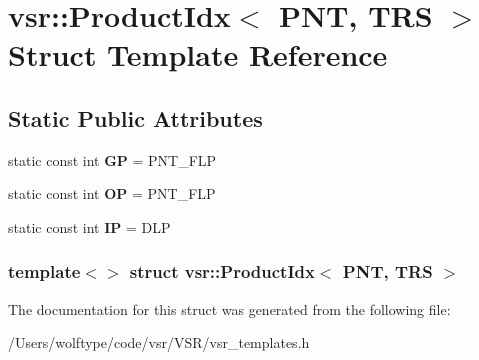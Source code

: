 \hypertarget{structvsr_1_1_product_idx_3_01_p_n_t_00_01_t_r_s_01_4}{\section{vsr\-:\-:Product\-Idx$<$ P\-N\-T, T\-R\-S $>$ Struct Template Reference}
\label{structvsr_1_1_product_idx_3_01_p_n_t_00_01_t_r_s_01_4}
}
\subsection*{Static Public Attributes}
\begin{DoxyCompactItemize}
\item 
\hypertarget{structvsr_1_1_product_idx_3_01_p_n_t_00_01_t_r_s_01_4_abad20631a42358074e38a0ce34bb4b93}{static const int {\bfseries G\-P} = P\-N\-T\-\_\-\-F\-L\-P}\label{structvsr_1_1_product_idx_3_01_p_n_t_00_01_t_r_s_01_4_abad20631a42358074e38a0ce34bb4b93}

\item 
\hypertarget{structvsr_1_1_product_idx_3_01_p_n_t_00_01_t_r_s_01_4_acdc399b27be2537343706407672795ed}{static const int {\bfseries O\-P} = P\-N\-T\-\_\-\-F\-L\-P}\label{structvsr_1_1_product_idx_3_01_p_n_t_00_01_t_r_s_01_4_acdc399b27be2537343706407672795ed}

\item 
\hypertarget{structvsr_1_1_product_idx_3_01_p_n_t_00_01_t_r_s_01_4_a541a42d1e35a02a208478da78a1f1462}{static const int {\bfseries I\-P} = D\-L\-P}\label{structvsr_1_1_product_idx_3_01_p_n_t_00_01_t_r_s_01_4_a541a42d1e35a02a208478da78a1f1462}

\end{DoxyCompactItemize}
\subsubsection*{template$<$$>$ struct vsr\-::\-Product\-Idx$<$ P\-N\-T, T\-R\-S $>$}



The documentation for this struct was generated from the following file\-:\begin{DoxyCompactItemize}
\item 
/\-Users/wolftype/code/vsr/\-V\-S\-R/vsr\-\_\-templates.\-h\end{DoxyCompactItemize}
